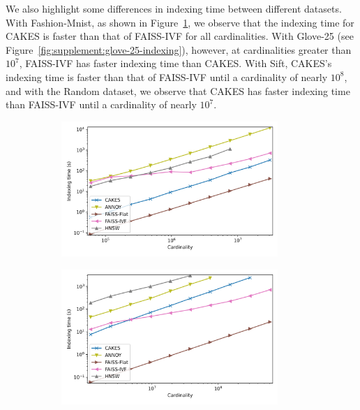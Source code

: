\documentclass{article}
\begin{document}
We also highlight some differences in indexing time between different datasets.
With Fashion-Mnist, as shown in Figure~\ref{fig:supplement:fashion-mnist-indexing}, we observe that the indexing time for CAKES is faster than that of FAISS-IVF for all cardinalities.
With Glove-25 (see Figure~\ref{fig:supplement:glove-25-indexing}), however, at cardinalities greater than $10^7$, FAISS-IVF has faster indexing time than CAKES.
With Sift, CAKES's indexing time is faster than that of FAISS-IVF until a cardinality of nearly $10^8$, and with the Random dataset, we observe that CAKES has faster indexing time than FAISS-IVF until a cardinality of nearly $10^7$.

\begin{figure}
    \captionsetup[subfigure]{aboveskip=-15pt,belowskip=-3pt}
    \begin{subfigure}[b]{0.47\textwidth}
        \includegraphics[width=0.9\textwidth]{images/indexing/fashion-mnist-indexing.png}\\
        \label{fig:supplement:fashion-mnist-indexing}
    \end{subfigure}%
    \begin{subfigure}[b]{0.47\textwidth}
        \includegraphics[width=0.9\textwidth]{images/indexing/glove-25-indexing.png}\\

\end{subfigure}
\end{figure}
\end{document}
